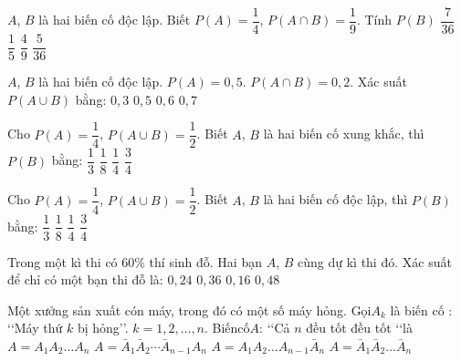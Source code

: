 \begin{ex}
$A$, $B$ là hai biến cố độc lập. Biết $P(A)=\dfrac{1}{4}$, $P\left(A\cap B\right)=\dfrac{1}{9}$. Tính $P(B)$
\choice
{$\dfrac{7}{36}$}
{$\dfrac{1}{5}$}
{\True $\dfrac{4}{9}$}
{$\dfrac{5}{36}$}
\end{ex}
\begin{ex}
$A$, $B$ là hai biến cố độc lập. $P(A)=0{,}5$. $P\left(A\cap B\right)=0{,}2$. Xác suất $P\left(A\cup B\right)$ bằng:
\choice
{$0{,}3$}
{$0{,}5$}
{$0{,}6$}
{\True $0{,}7$}
\end{ex}
\begin{ex}
Cho $P(A)=\dfrac{1}{4}$, $P\left(A\cup B\right)=\dfrac{1}{2}$. Biết $A$, $B$ là hai biến cố xung khắc, thì $P(B)$ bằng:
\choice
{$\dfrac{1}{3}$}
{$\dfrac{1}{8}$}
{\True $\dfrac{1}{4}$}
{$\dfrac{3}{4}$}
\end{ex}
\begin{ex}
Cho $P(A)=\dfrac{1}{4}$, $P\left(A\cup B\right)=\dfrac{1}{2}$. Biết $A$, $B$ là hai biến cố độc lập, thì $P(B)$ bằng:
\choice
{\True $\dfrac{1}{3}$}
{$\dfrac{1}{8}$}
{$\dfrac{1}{4}$}
{$\dfrac{3}{4}$}
\end{ex}
\begin{ex}
Trong một kì thi có $60\%$ thí sinh đỗ. Hai bạn $A$, $B$ cùng dự kì thi đó. Xác suất để chỉ có một bạn thi đỗ là:
\choice
{$0{,}24$}
{$0{,}36$}
{$0{,}16$}
{\True $0{,}48$}
\end{ex}
\begin{ex}
Một xưởng sản xuất cón máy, trong đó có một số máy hỏng. Gọi$A_k$ là biến cố : \lq\lq  Máy thứ $k$ bị hỏng\rq\rq . $k=1{,}2,\ldots ,n$. Biếncố$A$: \lq\lq  Cả $n$ đều tốt đều tốt \lq\lq  là
\choice
{$A=A_1A_2\ldots A_n$}
{$A=\bar{A}_1\bar{A}_2\cdots \bar{A}_{n-1} A_n$}
{$A=A_1A_2\ldots A_{n-1}\bar{A}_n$}
{\True $A=\bar{A}_1\bar{A}_2\ldots \bar{A}_n$}
\end{ex}
